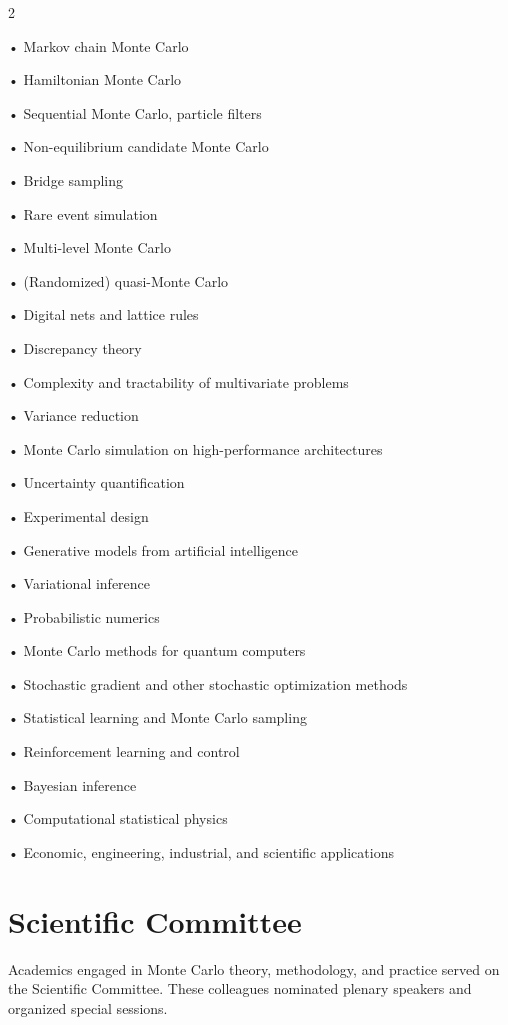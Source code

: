 \documentclass[12pt,lettersize,oneside]{book} %
\begin{document}
\setlength{\columnsep}{1cm}
\begin{multicols}{2}
	\raggedright
	• Markov chain Monte Carlo

	• Hamiltonian Monte Carlo

	• Sequential Monte Carlo, particle filters

	• Non-equilibrium candidate Monte Carlo

	• Bridge sampling

	• Rare event simulation

	• Multi-level Monte Carlo

	• (Randomized) quasi-Monte Carlo

	• Digital nets and lattice rules

	• Discrepancy theory

	• Complexity and tractability of multivariate problems

	• Variance reduction

	• Monte Carlo simulation on high-performance architectures

	• Uncertainty quantification

	• Experimental design

	• Generative models from artificial intelligence

	• Variational inference

	• Probabilistic numerics

	• Monte Carlo methods for quantum computers

	• Stochastic gradient and other stochastic optimization methods

	• Statistical learning and Monte Carlo sampling

	• Reinforcement learning and control

	• Bayesian inference

	• Computational statistical physics

	• Economic, engineering, industrial, and scientific applications

\end{multicols}






\section{Scientific Committee} \label{sci_com}

Academics engaged in Monte Carlo theory, methodology, and practice served on the Scientific Committee.  These colleagues nominated plenary speakers and organized special sessions.
\end{document}
